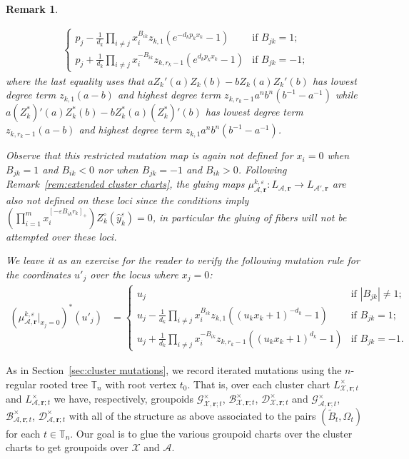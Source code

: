 \documentclass{amsart}
\newtheorem{remark}[theorem]{Remark}
\numberwithin{equation}{section}
\newcommand{\bfr}{{\boldsymbol{r}}}
\newcommand{\cA}{\mathcal{A}}
\newcommand{\cB}{\mathcal{B}}
\newcommand{\cD}{\mathcal{D}}
\newcommand{\cG}{\mathcal{G}}
\newcommand{\cX}{\mathcal{X}}
\newcommand{\TT}{\mathbb{T}}
\begin{document}
\begin{remark}
\begin{enumerate}
\begin{align*}
\begin{cases}
          p_j - \frac{1}{d_k} \prod_{i\ne j} x_i^{B_{ik}} z_{k,1} (e^{-d_kp_kx_k} - 1) & \text{if $B_{jk} = 1$;}\\ 
          p_j + \frac{1}{d_k} \prod_{i\ne j} x_i^{-B_{ik}} z_{k,r_k-1} (e^{d_kp_kx_k} - 1) & \text{if $B_{jk} = -1$;}
        \end{cases}
      \end{align*}
      where the last equality uses that $a Z_k'(a) Z_k(b) - b Z_k(a) Z_k'(b)$ has lowest degree term $z_{k,1}(a-b)$ and highest degree term $z_{k,r_k-1} a^n b^n (b^{-1}-a^{-1})$ while $a (Z_k^*)'(a) Z_k^*(b) - b Z_k^*(a) (Z_k^*)'(b)$ has lowest degree term $z_{k,r_k-1}(a-b)$ and highest degree term $z_{k,1} a^n b^n (b^{-1}-a^{-1})$.

      Observe that this restricted mutation map is again not defined for $x_i=0$ when $B_{jk}=1$ and $B_{ik} < 0$ nor when $B_{jk} = -1$ and $B_{ik} > 0$.
      Following Remark~\ref{rem:extended cluster charts}, the gluing maps $\mu_{\cA,\bfr}^{k,\varepsilon}:L_{\cA,\bfr}\to L_{\cA',\bfr}$ are also not defined on these loci since the conditions imply $\left(\prod\limits_{i=1}^m x_i^{[-\varepsilon B_{ik}r_k]_+}\right)Z_k^\circ(\hat y_k^\varepsilon)=0$, in particular the gluing of fibers will not be attempted over these loci. 

      We leave it as an exercise for the reader to verify the following mutation rule for the coordinates $u'_j$ over the locus where $x_j=0$:
      \begin{align*}
        (\mu_{\cA,\bfr}^{k,\varepsilon}|_{x_j=0})^*(u'_j)
        &=\begin{cases} 
          u_j & \text{if $|B_{jk}| \ne 1$;}\\ 
          u_j - \frac{1}{d_k} \prod_{i\ne j} x_i^{B_{ik}} z_{k,1} ((u_k x_k+1)^{-d_k} - 1) & \text{if $B_{jk} = 1$;}\\ 
          u_j + \frac{1}{d_k} \prod_{i\ne j} x_i^{-B_{ik}} z_{k,r_k-1} ((u_k x_k +1)^{d_k} - 1) & \text{if $B_{jk} = -1$.}
        \end{cases}
      \end{align*}
  \end{enumerate}
\end{remark}

As in Section~\ref{sec:cluster mutations}, we record iterated mutations using the $n$-regular rooted tree $\TT_n$ with root vertex $t_0$.
That is, over each cluster chart $L^\times_{\cX,\bfr;t}$ and $L^\times_{\cA,\bfr;t}$ we have, respectively, groupoids $\cG^\times_{\cX,\bfr;t}$, $\cB^\times_{\cX,\bfr;t}$, $\cD^\times_{\cX,\bfr;t}$ and $\cG^\times_{\cA,\bfr;t}$, $\cB^\times_{\cA,\bfr;t}$, $\cD^\times_{\cA,\bfr;t}$ with all of the structure as above associated to the pairs $(\tilde B_t,\Omega_t)$ for each $t\in\TT_n$.
Our goal is to glue the various groupoid charts over the cluster charts to get groupoids over $\cX$ and $\cA$.
\end{document}

